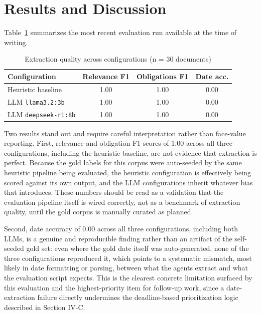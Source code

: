 \documentclass[conference]{IEEEtran}
\begin{document}
\section{Results and Discussion}

Table~\ref{tab:results} summarizes the most recent evaluation run available at the time of writing.

\begin{table}[t]
\caption{Extraction quality across configurations (n = 30 documents)}
\label{tab:results}
\centering
\begin{tabular}{|l|c|c|c|}
\hline
\textbf{Configuration} & \textbf{Relevance F1} & \textbf{Obligations F1} & \textbf{Date acc.} \\
\hline
Heuristic baseline & 1.00 & 1.00 & 0.00 \\
\hline
LLM \texttt{llama3.2:3b} & 1.00 & 1.00 & 0.00 \\
\hline
LLM \texttt{deepseek-r1:8b} & 1.00 & 1.00 & 0.00 \\
\hline
\end{tabular}
\end{table}

Two results stand out and require careful interpretation rather than face-value reporting. First, relevance and obligation F1 scores of 1.00 across all three configurations, including the heuristic baseline, are not evidence that extraction is perfect. Because the gold labels for this corpus were auto-seeded by the same heuristic pipeline being evaluated, the heuristic configuration is effectively being scored against its own output, and the LLM configurations inherit whatever bias that introduces. These numbers should be read as a validation that the evaluation pipeline itself is wired correctly, not as a benchmark of extraction quality, until the gold corpus is manually curated as planned.

Second, date accuracy of 0.00 across all three configurations, including both LLMs, is a genuine and reproducible finding rather than an artifact of the self-seeded gold set: even where the gold date itself was auto-generated, none of the three configurations reproduced it, which points to a systematic mismatch, most likely in date formatting or parsing, between what the agents extract and what the evaluation script expects. This is the clearest concrete limitation surfaced by this evaluation and the highest-priority item for follow-up work, since a date-extraction failure directly undermines the deadline-based prioritization logic described in Section IV-C.
\end{document}
